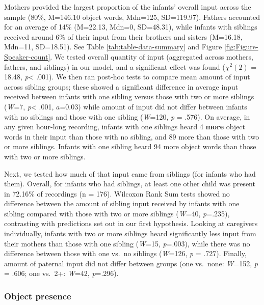 \documentclass[
  man,floatsintext]{apa6}
\begin{document}
Mothers provided the largest proportion of the infants' overall input across the sample (80\%, M=146.10 object words, Mdn=125, SD=119.97). Fathers accounted for an average of 14\% (M=22.13, Mdn=0, SD=48.31), while infants with siblings received around 6\% of their input from their brothers and sisters (M=16.18, Mdn=11, SD=18.51). See Table \ref{tab:table-data-summary} and Figure \ref{fig:Figure-Speaker-count}. We tested overall quantity of input (aggregated across mothers, fathers, and siblings) in our model, and a significant effect was found (\(\chi^2 (2)\) = 18.48, \emph{p}\textless{} .001). We then ran post-hoc tests to compare mean amount of input across sibling groups; these showed a significant difference in average input received between infants with one sibling versus those with two
or more siblings (\emph{W}=7, \emph{p}\textless{} .001, \(a\)=0.03) while amount of input did not differ between infants with no siblings and those with one sibling (\emph{W}=120, \emph{p} = .576). On average, in any given hour-long recording, infants with one siblings heard 4 \textbf{more} object words in their input than those with no sibling, and 89 more than those with two or more siblings. Infants with one sibling heard 94 more object words than those with two or more siblings.

Next, we tested how much of that input came from siblings (for infants who had them). Overall, for infants who had siblings, at least one other child was present in 72.16\% of recordings (n = 176). Wilcoxon Rank Sum tests showed no difference between the amount of sibling input received by infants with one sibling compared with those with two or more siblings (\emph{W}=40, \emph{p}=.235), contrasting with predictions set out in our first hypothesis. Looking at caregivers individually, infants with two or more siblings heard significantly less input from their mothers than those with one sibling (\emph{W}=15, \emph{p}=.003), while there was no difference between those with one vs.~no siblings (\emph{W}=126, \emph{p} = .727). Finally, amount of paternal input did not differ between groups (one vs.~none: \emph{W}=152, \emph{p} = .606; one vs.~2+: \emph{W}=42, \emph{p}=.296).

\hypertarget{object-presence}{%
\subsubsection{Object presence}\label{object-presence}}
\end{document}
